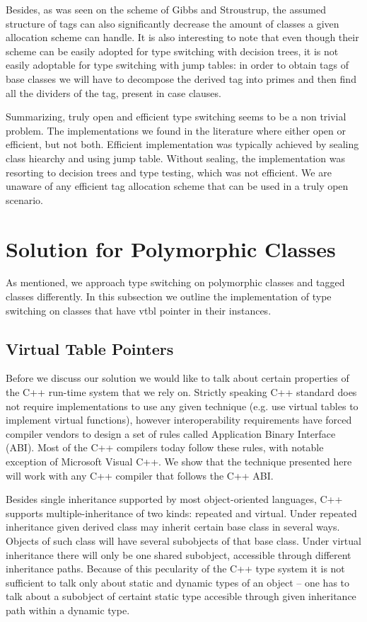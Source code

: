 \documentclass[preprint]{sigplanconf}
\begin{document}
Besides, as was seen on the scheme of Gibbs and Stroustrup, the assumed 
structure of tags can also significantly decrease the amount of classes a given 
allocation scheme can handle. It is also interesting to note that even though 
their scheme can be easily adopted for type switching with decision trees, it is 
not easily adoptable for type switching with jump tables: in order to obtain 
tags of base classes we will have to decompose the derived tag into primes and 
then find all the dividers of the tag, present in case clauses.

Summarizing, truly open and efficient type switching seems to be a non trivial 
problem. The implementations we found in the literature where either open or 
efficient, but not both. Efficient implementation was typically achieved by 
sealing class hiearchy and using jump table. Without sealing, the implementation 
was resorting to decision trees and type testing, which was not efficient.
We are unaware of any efficient tag allocation scheme that can be used in a 
truly open scenario.

\section{Solution for Polymorphic Classes}
\label{sec:copc}

As mentioned, we approach type switching on polymorphic classes and tagged 
classes differently. In this subsection we outline the implementation of type 
switching on classes that have vtbl pointer in their instances.

\subsection{Virtual Table Pointers}
\label{sec:vtp}

Before we discuss our solution we would like to talk about certain properties of 
the C++ run-time system that we rely on. Strictly speaking C++ standard does not 
require implementations to use any given technique (e.g. use virtual tables to 
implement virtual functions), however interoperability requirements have forced 
compiler vendors to design a set of rules called Application Binary Interface 
(ABI)\cite{C++ABI}. Most of the C++ compilers today follow these rules, with 
notable exception of Microsoft Visual C++. We show that the technique presented 
here will work with any C++ compiler that follows the C++ ABI. 

Besides single inheritance supported by most object-oriented languages, C++ 
supports multiple-inheritance of two kinds: repeated and virtual. Under repeated 
inheritance given derived class may inherit certain base class in several ways. 
Objects of such class will have several subobjects of that base class. Under 
virtual inheritance there will only be one shared subobject, accessible through 
different inheritance paths. Because of this pecularity of the C++ type system 
it is not sufficient to talk only about static and dynamic types of an object -- 
one has to talk about a subobject of certaint static type accesible through 
given inheritance path within a dynamic type.
\end{document}
